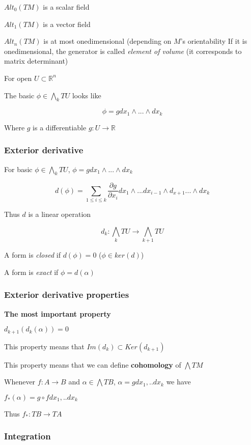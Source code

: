 \documentclass[11pt]{article}
\begin{document}
\(Alt_0(TM)\) is a scalar field

\(Alt_1(TM)\) is a vector field

\(Alt_n(TM)\) is at most onedimensional (depending on \(M\)'s orientability
If it is onedimensional, the generator is called \emph{element of volume} (it corresponds to matrix determinant)

For open \(U \subset \mathbb{R}^n\)

The basic \(\phi \in \bigwedge_k TU\) looks like



$$\phi = g dx_1 \wedge ... \wedge dx_k$$

Where \(g\) is a differentiable \(g: U \to \mathbb{R}\)

\subsubsection{Exterior derivative}
\label{sec:org5ab7b16}

For basic \(\phi \in \bigwedge_k TU\), \(\phi = g dx_1 \wedge ... \wedge dx_k\)

$$d(\phi) = \sum_{1 \leq i \leq k} \frac{\partial g}{\partial x_i}  dx_1 \wedge ... dx_{i-1} \wedge d_{x+1} ... \wedge dx_k$$

Thus \(d\) is a linear operation

$$d_k: \bigwedge_k TU \to \bigwedge_{k+1} TU$$

A form is \emph{closed} if \(d(\phi) = 0\) (\(\phi \in ker(d)\))

A form is \emph{exact} if \(\phi = d(\alpha)\)


\subsubsection{Exterior derivative properties}
\label{sec:org3a0ded1}
\textbf{The most important property}

\(d_{k+1}(d_k(\alpha)) = 0\)

This property means that \(Im(d_{k}) \subset Ker(d_{k+1})\)

This property means that we can define \textbf{cohomology} of \(\bigwedge TM\)

Whenever \(f: A \to B\) and \(\alpha \in \bigwedge TB\), \(\alpha = g dx_1, .. dx_k\) we have

\(f_{*}(\alpha) = g \circ f dx_1, .. dx_k\)

Thus \(f_{*}: TB \to TA\)

\subsubsection{Integration}
\label{sec:org4c10101}
\end{document}
